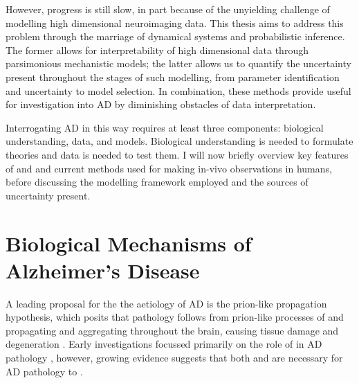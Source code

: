 However, progress is still slow, in part because of the unyielding challenge of
modelling high dimensional neuroimaging data. This thesis aims to address this
problem through the marriage of dynamical systems and probabilistic inference.
The former allows for interpretability of high dimensional data through 
parsimonious mechanistic models; the latter
allows us to quantify the uncertainty present throughout the stages of such
modelling, from parameter identification and uncertainty to model selection. In
combination, these methods provide useful for investigation into AD by
diminishing obstacles of data interpretation. 

Interrogating AD in this way requires at least three components: biological
understanding, data, and models. Biological understanding is needed to formulate
theories and data is needed to test  
them. I will now briefly overview key features of \AB and \TP and current
methods used for making in-vivo observations in humans, before discussing the
modelling framework employed and the sources of uncertainty present.

\section{Biological Mechanisms of Alzheimer's Disease}
\label{sec:1-bio-ad}


A leading proposal for the the aetiology of AD is the prion-like propagation
hypothesis, which posits that pathology follows from prion-like processes of \AB
and \TP propagating and aggregating throughout the brain, causing tissue damage
and degeneration \cite{walker2015neurodegenerative, goedert2015alzheimer,
aoyagi2019abeta}. Early investigations focussed primarily on the role of \AB in
AD pathology \cite{selkoe1991molecular, hardy1991amyloid, hardy1992alzheimer,
hardy2002amyloid}, however, growing evidence suggests that both \AB and \TP are
necessary for AD pathology to \cite{selkoe2016amyloid, kametani2018reconsideration,
aoyagi2019abeta, ossenkoppele2022amyloid}.  

